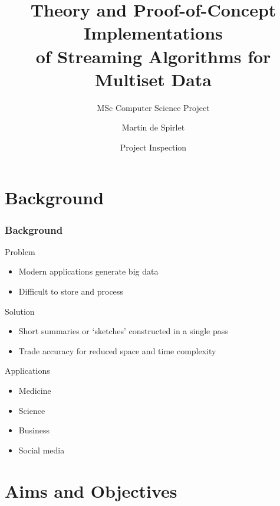 \documentclass{beamer}
\title[Streaming Algorithms]{Theory and Proof-of-Concept Implementations \\ of Streaming Algorithms for Multiset Data}
\subtitle{MSc Computer Science Project}
\author{Martin de Spirlet}
\institute[]{University of Birmingham}
\date{Project Inspection}
\begin{document}
\begin{frame}
  \titlepage
\end{frame}

\section{Background}

\begin{frame}
  \frametitle{Background}

  \begin{block}{Problem}
    \begin{itemize}
      \item Modern applications generate big data
      \item Difficult to store and process
    \end{itemize}
  \end{block}

  \begin{block}{Solution}
    \begin{itemize}
      \item Short summaries or `sketches' constructed in a single pass
      \item Trade accuracy for reduced space and time complexity
    \end{itemize}
  \end{block}

  \begin{block}{Applications}
    \begin{itemize}
      \item Medicine
      \item Science
      \item Business
      \item Social media
    \end{itemize}
  \end{block}
\end{frame}

\section{Aims and Objectives}
\end{document}
